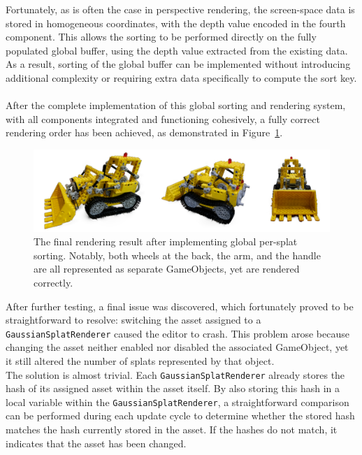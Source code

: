\documentclass[12pt]{article}
\begin{document}
Fortunately, as is often the case in perspective rendering, the screen-space data is stored in homogeneous coordinates, with the depth value encoded in the fourth component. This allows the sorting to be performed directly on the fully populated global buffer, using the depth value extracted from the existing data. As a result, sorting of the global buffer can be implemented without introducing additional complexity or requiring extra data specifically to compute the sort key.\\\\
After the complete implementation of this global sorting and rendering system, with all components integrated and functioning cohesively, a fully correct rendering order has been achieved, as demonstrated in Figure~\ref{fig:finalrender}.
\begin{figure}[h!]
	\centering
	\includegraphics[width=\textwidth]{Images/finalrender.png}
	\caption{The final rendering result after implementing global per-splat sorting. Notably, both wheels at the back, the arm, and the handle are all represented as separate GameObjects, yet are rendered correctly.}
	\label{fig:finalrender}
\end{figure}
\FloatBarrier
\noindent
After further testing, a final issue was discovered, which fortunately proved to be straightforward to resolve: switching the asset assigned to a 
\linebreak 
\texttt{GaussianSplatRenderer} caused the editor to crash. This problem arose because changing the asset neither enabled nor disabled the associated GameObject, yet it still altered the number of splats represented by that object.
\\
The solution is almost trivial. Each \texttt{GaussianSplatRenderer} already stores the hash of its assigned asset within the asset itself. By also storing this hash in a local variable within the \texttt{GaussianSplatRenderer}, a straightforward comparison can be performed during each update cycle to determine whether the stored hash matches the hash currently stored in the asset. If the hashes do not match, it indicates that the asset has been changed.
\\
\end{document}
